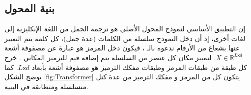 \subsection{بنية المحول}
          
إن التطبيق الأساسي لنموذج المحول الأصلي
هو ترجمة الجمل من اللغة الإنكليزية إلى لغات أخرى، إذ أن دخل النموذج سلسلة من الكلمات (عدة جمل)، كل كلمة يتم التعبير عنها بشعاع من الأرقام ندعوه بالـ
،
فيكون دخل المرمز هو عبارة عن مصفوفة أشعة
$X \in \mathds{R}^{L \mathsf{x}d}$.
\newline
لتمييز مكان كل عنصر من السلسلة  يتم إضافة قيم للترميز المكاني
.
خرج كل طبقة من طبقات المرمز وطبقات مفكك الترميز
هو مصفوفة أشعة بأبعاد
$L \mathsf{x} d$.
كما يوضح الشكل
\ref{fig:Transformer}
يتكون كل من المرمز و مفكك الترميز
 من عدة كتل متسلسلة ومتطابقة في البنية.
